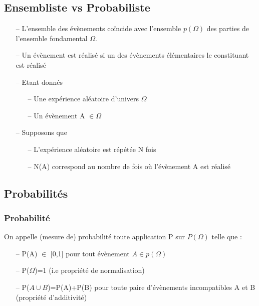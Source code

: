 \documentclass{article}
\begin{document}
        \subsection{Ensembliste vs Probabiliste}
                \begin{itemize}
                    \item[--] L'ensemble des évènements coïncide avec l'ensemble
                    $p(\Omega)$ des parties de l'ensemble fondamental $\Omega$.
                    \item[--] Un évènement est réalisé si un des évènements élémentaires
                    le constituant est réalisé 
                    \item[--] Etant donnés
                    \begin{itemize}
                        \item[--] Une expérience aléatoire d'univers $\Omega$
                        \item[--] Un évènement A $\in \Omega$
                    \end{itemize}
                    \item[--] Supposons que
                    \begin{itemize}
                        \item[--] L'expérience aléatoire est répétée N fois
                        \item[--] N(A) correspond au nombre de fois où l'évènement A est
                        réalisé 
                    \end{itemize} 
                \end{itemize}
                
        \subsection{Probabilités}
            \subsubsection{Probabilité}
                On appelle (mesure de) probabilité toute application P sur $P(\Omega)$ telle que :
                \begin{itemize}
                    \item[--] P(A) $\in$ [0,1] pour tout évènement $A \in p(\Omega)$
                    \item[--] P($\Omega$)=1 (i.e propriété de normalisation)
                    \item[--] P($A \cup B$)=P(A)+P(B) pour toute paire d'évènements 
                    incompatibles A et B (propriété d'additivité)
                \end{itemize}
\end{document}
